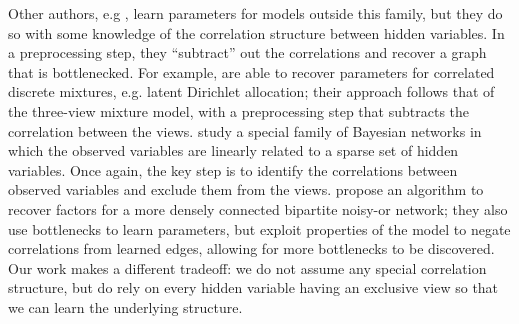 
Other authors, e.g \citet{anandkumar12lda, anandkumar2013linear,
  halpern2013unsupervised}, learn parameters for models outside this
  family, but they do so with some knowledge of the correlation structure
  between hidden variables. 
In a preprocessing step, they ``subtract'' out the correlations and
  recover a graph that is bottlenecked.
%
For example,
\citet{anandkumar12lda} are able to recover parameters for correlated
  discrete mixtures, e.g. latent Dirichlet allocation; their approach
  follows that of the three-view mixture model, with a preprocessing step
  that subtracts the correlation between the views.
\citet{anandkumar2013linear} study a special family of Bayesian networks
  in which the observed variables are linearly related to a sparse set of
  hidden variables. Once again, the key step is to identify the
  correlations between observed variables and exclude them from the views.
\citet{halpern2013unsupervised} propose an algorithm to recover factors for
  a more densely connected bipartite noisy-or network; they also use
  bottlenecks to learn parameters, but exploit properties of the model
  to negate correlations from learned edges, allowing for more
  bottlenecks to be discovered. 
Our work makes a different tradeoff: we do not assume any special correlation structure,
but do rely on every hidden variable having an exclusive view so that we can
learn the underlying structure.


